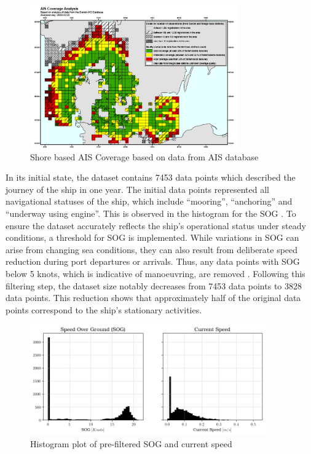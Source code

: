\begin{figure}
    \centering
        \includegraphics[width=0.8\textwidth]{02_figures/AIS_Coverage.png}
        \caption{Shore based AIS Coverage based on data from AIS database }
        \label{fig:aiscoverage}
\end{figure}

In its initial state, the dataset contains 7453 data points which described the journey of the ship in one year. The initial data points represented all navigational statuses of the ship, which include ``mooring'', ``anchoring'' and ``underway using engine''. This is observed in the histogram for the SOG . To ensure the dataset accurately reflects the ship's operational status under steady conditions, a threshold for SOG is implemented. While variations in SOG can arise from changing sea conditions, they can also result from deliberate speed reduction during port departures or arrivals. Thus, any data points with SOG below 5 knots, which is indicative of manoeuvring, are removed . Following this filtering step, the dataset size notably decreases from 7453 data points to 3828 data points. This reduction shows that approximately half of the original data points correspond to the ship's stationary activities.\\

\begin{figure}[h!]
    \centering
        \includegraphics[width=0.9\textwidth]{02_figures/sog_curspeed_anomalies.png}
        \caption{Histogram plot of pre-filtered SOG and current speed}
        \label{fig:anomalies_sog_curspeed}
\end{figure}

